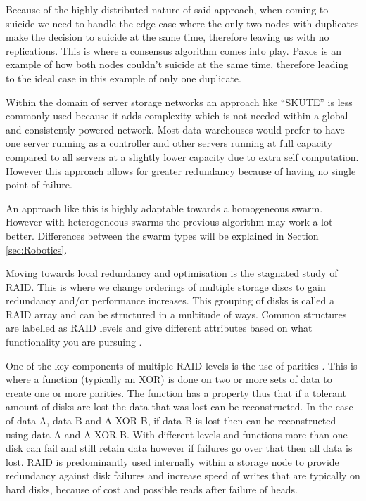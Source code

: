 \documentclass{UoYCSproject}
\begin{document}
Because of the highly distributed nature of said approach, when coming to suicide we need to handle the edge case where the only two nodes with duplicates make the decision to suicide at the same time, therefore leaving us with no replications. 
This is where a consensus algorithm comes into play. 
Paxos \cite{Paxos} is an example of how both nodes couldn’t suicide at the same time, therefore leading to the ideal case in this example of only one duplicate. 

Within the domain of server storage networks an approach like “SKUTE” is less commonly used because it adds complexity which is not needed within a global and consistently powered network. 
Most data warehouses would prefer to have one server running as a controller and other servers running at full capacity compared to all servers at a slightly lower capacity due to extra self computation. 
However this approach allows for greater redundancy because of having no single point of failure.

An approach like this is highly adaptable towards a homogeneous swarm. 
However with heterogeneous swarms the previous algorithm may work a lot better. 
Differences between the swarm types will be explained in Section \ref{sec:Robotics}. 

Moving towards local redundancy and optimisation is the stagnated study of RAID. 
This is where we change orderings of multiple storage discs to gain redundancy and/or performance increases. 
This grouping of disks is called a RAID array and can be structured in a multitude of ways. 
Common structures are labelled as RAID levels and give different attributes based on what functionality you are pursuing \cite{RAID Levels}. 

One of the key components of multiple RAID levels is the use of parities \cite{Raid parity}. 
This is where a function (typically an XOR) is done on two or more sets of data to create one or more parities. 
The function has a property thus that if a tolerant amount of disks are lost the data that was lost can be reconstructed. 
In the case of data A, data B and A XOR B, if data B is lost then can be reconstructed using data A and A XOR B. 
With different levels and functions more than one disk can fail and still retain data however if failures go over that then all data is lost. 
RAID is predominantly used internally within a storage node to provide redundancy against disk failures and increase speed of writes that are typically on hard disks, because of cost and possible reads after failure of heads. 
\end{document}
